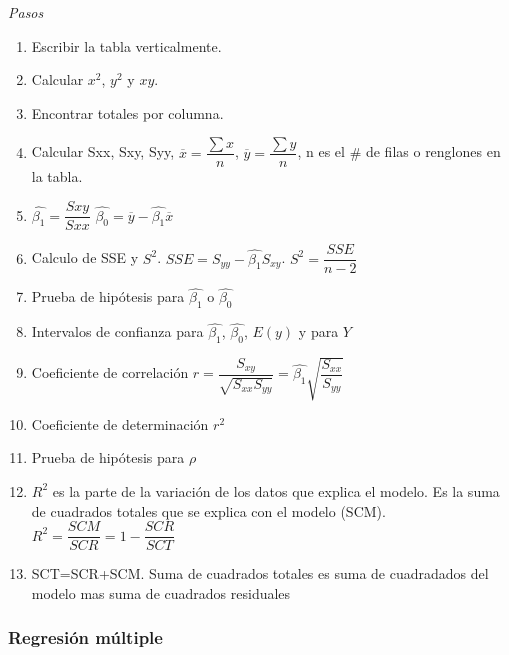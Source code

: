 \textit{Pasos}
\begin{enumerate}
	\item Escribir la tabla verticalmente.
	\item Calcular $x^2$, $y^2$ y $xy$.
	\item Encontrar totales por columna.
	\item Calcular Sxx, Sxy, Syy, $\overline{x}=\dfrac{\sum x}{n}$, $\overline{y}=\dfrac{\sum y}{n}$, n es el $\#$ de filas o renglones en la tabla.
	\item $\hat{\beta_1}=\dfrac{Sxy}{Sxx}$ $\hat{\beta_0}=\overline{y}-\hat{\beta_1}\overline{x}$
	\item Calculo de SSE y $S^2$. $SSE=S_{yy}-\hat{\beta_1}S_{xy}$. $S^2=\dfrac{SSE}{n-2}$
	\item Prueba de hipótesis para $\hat{\beta_1}$ o $\hat{\beta_0}$
	\item Intervalos de confianza para  $\hat{\beta_1}$, $\hat{\beta_0}$, $E(y)$ y para $Y$
	\item Coeficiente de correlación $r=\dfrac{S_{xy}}{\sqrt{S_{xx}S_{yy}}}=\hat{\beta_1}\sqrt{\dfrac{S_{xx}}{S_{yy}}}$
	\item Coeficiente de determinación $r^2$
	\item Prueba de hipótesis para $\rho$
	\item $R^2$ es la parte de la variación de los datos que explica el modelo. Es la suma de cuadrados totales que se explica con el modelo (SCM). $R^2=\dfrac{SCM}{SCR}=1-\dfrac{SCR}{SCT}$
	
	\item SCT=SCR+SCM. Suma de cuadrados totales es suma de cuadradados del modelo mas suma de cuadrados residuales
\end{enumerate}

\subsubsection{Regresión múltiple}

